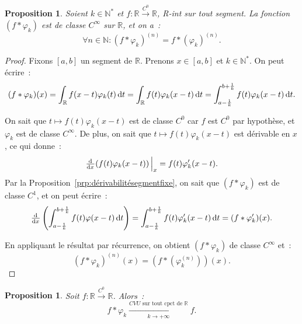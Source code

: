 \documentclass{report}
\newtheorem{prp}[thm]{Proposition}
\theoremstyle{definition}
\theoremstyle{remark}
\numberwithin{equation}{section}
\newcommand{\R}{\mathbb R}
\newcommand{\N}{\mathbb N}
\newcommand{\Ns}{\N^{*}}
\newcommand{\CONV}[5]{\xrightarrow[#2 \to #3]{#4 \text{ #5 } #1}}
\newcommand{\CVUc}[3]{\CONV{#1}{#2}{#3}{CVU}{sur tout cpct de}}
\newcommand{\toC}[1]{\xrightarrow{C^{#1}}}
\newcommand{\pinfty}{{+\infty}}
\begin{document}
			\begin{prp}\label{prp:(f*varphi)'=f*varphi'} Soient $k \in \Ns$ et $f : \R \toC0 \R$, R-int sur tout segment. La fonction $(f * \varphi_k)$ est
			de classe $C^\infty$ sur $\R$, et on a~:
			\begin{equation}
				\forall n \in \N : (f * \varphi_k)^{(n)} = f * (\varphi_k)^{(n)}.
			\end{equation}
			\end{prp}

			\begin{proof} Fixons $[a, b]$ un segment de $\R$. Prenons $x \in [a, b]$ et $k \in \Ns$. On peut écrire~:
			\begin{equation}
				(f * \varphi_k)(x) = \int_\R f(x-t)\varphi_k(t)\dif t = \int_\R f(t)\varphi_k(x-t)\dif t = \int_{a-\frac 1k}^{b+\frac 1k}f(t)\varphi_k(x-t)\dif t.
			\end{equation}

			On sait que $t \mapsto f(t)\varphi_k(x-t)$ est de classe $C^0$ car $f$ est $C^0$ par hypothèse, et $\varphi_k$ est de classe $C^\infty$. De plus, on
			sait que $t \mapsto f(t)\varphi_k(x-t)$ est dérivable en $x$, ce qui donne~:
			\begin{equation}
				\od {}x(f(t)\varphi_k(x-t))\sVert[2]_x = f(t)\varphi_k'(x-t).
			\end{equation}
			Par la Proposition~\ref{prp:dérivabilitésegmentfixe}, on sait que $(f*\varphi_k)$ est de classe $C^1$, et on peut écrire~:
			\begin{equation}
				\od {}x\left(\int_{a-\frac 1k}^{b+\frac 1k}f(t)\varphi(x-t)\dif t\right) = \int_{a-\frac 1k}^{b+\frac 1k}f(t)\varphi_k'(x-t)\dif t = (f * \varphi_k')(x).
			\end{equation}

			En appliquant le résultat par récurrence, on obtient $(f*\varphi_k)$ de classe $C^\infty$ et~:
			\begin{equation}
				\left(f*\varphi_k\right)^{(n)}(x) = \left(f*\left(\varphi_k^{(n)}\right)\right)(x).
			\end{equation}
			\end{proof}

			\begin{prp}\label{prp:f*varphi_k CVUc f} Soit $f : \R \toC0 \R$. Alors~:
			\begin{equation}
				f*\varphi_k \CVUc \R k\pinfty f.
			\end{equation}
			\end{prp}
\end{document}
